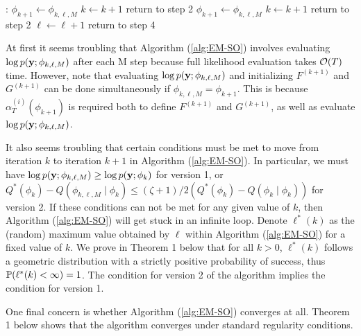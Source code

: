 \begin{algorithm}
\begin{algorithmic}[1]
%
\vspace{10pt}
%
:
    \State $\phi_{k+1} \gets \phi_{k,\ell,M}$
    \State $k \gets k+1$
    \State return to step 2
    \State $\phi_{k+1} \gets \phi_{k,\ell,M}$
    \State $k \gets k+1$
    \State return to step 2
\Else
    \State $\ell \gets \ell+1$
    \State return to step 4
\EndIf
%
\vspace{10pt}
%
\end{algorithmic}
\end{algorithm}

At first it seems troubling that Algorithm (\ref{alg:EM-SO}) involves evaluating $\log p(\mathbf{y};\phi_{k,\ell,M})$ after each M step because full likelihood evaluation takes $\mathcal{O}(T)$ time. However, note that evaluating $\log p(\mathbf{y};\phi_{k,\ell,M})$ and initializing $F^{(k+1)}$ and $G^{(k+1)}$ can be done simultaneously if $\phi_{k,\ell,M} = \phi_{k+1}$. This is because $\alpha_T^{(i)}(\phi_{k+1})$ is required both to define $F^{(k+1)}$ and $G^{(k+1)}$, as well as evaluate $\log p(\mathbf{y};\phi_{k,\ell,M})$.

It also seems troubling that certain conditions must be met to move from iteration $k$ to iteration $k+1$ in Algorithm (\ref{alg:EM-SO}). In particular, we must have $\log p(\mathbf{y};\phi_{k,\ell,M}) \geq \log p(\mathbf{y};\phi_{k})$ for version 1, or $Q^*(\phi_k) - Q(\phi_{k,\ell,M} \mid \phi_k) \leq (\zeta+1)/2 \left(Q^*(\phi_k) - Q(\phi_{k} \mid \phi_k) \right)$ for version 2. If these conditions can not be met for any given value of $k$, then Algorithm (\ref{alg:EM-SO}) will get stuck in an infinite loop. Denote $\ell^*(k)$ as the (random) maximum value obtained by $\ell$ within Algorithm (\ref{alg:EM-SO}) for a fixed value of $k$. We prove in Theorem 1 below that for all $k > 0$, $\ell^*(k)$ follows a geometric distribution with a strictly positive probability of success, thus $\mathbb{P}(\ell^*(k) < \infty) = 1$. The condition for version 2 of the algorithm implies the condition for version 1.

One final concern is whether Algorithm (\ref{alg:EM-SO}) converges at all. %
Theorem 1 below shows that the algorithm converges under standard regularity conditions. %

